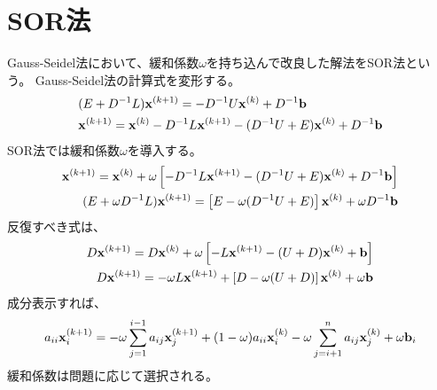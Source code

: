 \documentclass[twocolumn]{jsarticle}
\newcommand{\kakko}[1][]{(#1)}
\newcommand{\bx}{\bold{x}}
\newcommand{\bb}{\bold{b}}
\begin{document}
\section{SOR法}
Gauss-Seidel法において、緩和係数$\omega$を持ち込んで改良した解法をSOR法という。
Gauss-Seidel法の計算式を変形する。
\begin{align}
&    (E + D^{-1}L)\bx^{\kakko[k+1]} = - D^{-1} U \bx^{\kakko[k]} + D^{-1}\bold{b}\\
&    \bx^{\kakko[k+1]} = \bx^{\kakko[k]}-D^{-1}L\bx^{\kakko[k+1]}- (D^{-1} U+E) \bx^{\kakko[k]} + D^{-1}\bold{b}
\end{align}
SOR法では緩和係数$\omega$を導入する。
\begin{align}
  \bx^{\kakko[k+1]} = \bx^{\kakko[k]} +\omega\left[-D^{-1}L\bx^{\kakko[k+1]}- (D^{-1} U+E) \bx^{\kakko[k]} + D^{-1}\bb \right]\\
  (E + \omega D^{-1}L)\bx^{\kakko[k+1]} = \left[E-\omega(D^{-1} U+E)\right] \bx^{\kakko[k]} + \omega D^{-1}\bb 
\end{align}
反復すべき式は、
\begin{align}
  D\bx^{\kakko[k+1]} = D\bx^{\kakko[k]} +\omega\left[-L\bx^{\kakko[k+1]}- (U+D) \bx^{\kakko[k]} + \bb \right]\\
  D\bx^{\kakko[k+1]} = - \omega L\bx^{\kakko[k+1]} +\left[D- \omega (U+D)\right] \bx^{\kakko[k]} + \omega\bb 
\end{align}
成分表示すれば、
\begin{equation}
a_{ii}\bx^{\kakko[k+1]}_i = - \omega\sum^{i-1}_{j=1} a_{ij}\bx^{\kakko[k+1]}_j + (1- \omega) a_{ii}\bx^{\kakko[k]}_i -\omega\sum^{n}_{j=i+1}a_{ij}\bx^{\kakko[k]}_j+\omega\bb_i
\end{equation}
緩和係数は問題に応じて選択される。
\end{document}
